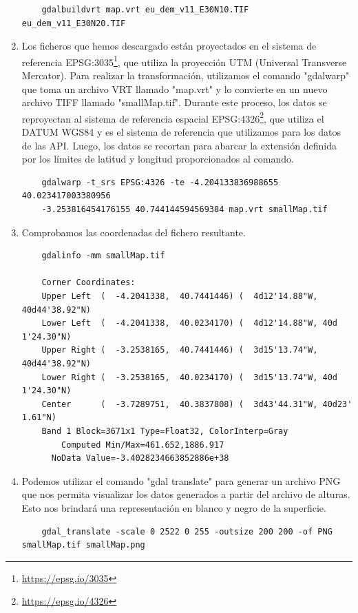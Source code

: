 \documentclass[a4paper, 11pt]{book}
\begin{document}
\begin{enumerate}
    {\scriptsize
    \begin{verbatim}
    gdalbuildvrt map.vrt eu_dem_v11_E30N10.TIF eu_dem_v11_E30N20.TIF
    \end{verbatim}
    }
    
    \item Los ficheros que hemos descargado están proyectados en el sistema de referencia EPSG:3035\footnote{\url{https://epsg.io/3035}}, que utiliza la proyección UTM (Universal Transverse Mercator). Para realizar la transformación, utilizamos el comando "gdalwarp" que toma un archivo VRT llamado "map.vrt" y lo convierte en un nuevo archivo TIFF llamado "smallMap.tif". Durante este proceso, los datos se reproyectan al sistema de referencia espacial EPSG:4326\footnote{\url{https://epsg.io/4326}}, que utiliza el DATUM WGS84 y es el sistema de referencia que utilizamos para los datos de las API. Luego, los datos se recortan para abarcar la extensión definida por los límites de latitud y longitud proporcionados al comando.

    {\scriptsize
    \begin{verbatim}
    gdalwarp -t_srs EPSG:4326 -te -4.204133836988655 40.023417003380956
    -3.253816454176155 40.744144594569384 map.vrt smallMap.tif
    \end{verbatim}
    }

    \item Comprobamos las coordenadas del fichero resultante.

    {\scriptsize
    \begin{verbatim}
    gdalinfo -mm smallMap.tif

    Corner Coordinates:
    Upper Left  (  -4.2041338,  40.7441446) (  4d12'14.88"W, 40d44'38.92"N)
    Lower Left  (  -4.2041338,  40.0234170) (  4d12'14.88"W, 40d 1'24.30"N)
    Upper Right (  -3.2538165,  40.7441446) (  3d15'13.74"W, 40d44'38.92"N)
    Lower Right (  -3.2538165,  40.0234170) (  3d15'13.74"W, 40d 1'24.30"N)
    Center      (  -3.7289751,  40.3837808) (  3d43'44.31"W, 40d23' 1.61"N)
    Band 1 Block=3671x1 Type=Float32, ColorInterp=Gray
        Computed Min/Max=461.652,1886.917
      NoData Value=-3.4028234663852886e+38
    \end{verbatim}
    }
    \item Podemos utilizar el comando "gdal translate" para generar un archivo PNG que nos permita visualizar los datos generados a partir del archivo de alturas. Esto nos brindará una representación en blanco y negro de la superficie.
    {\scriptsize
    \begin{verbatim}
    gdal_translate -scale 0 2522 0 255 -outsize 200 200 -of PNG smallMap.tif smallMap.png
    \end{verbatim}
    }
    

\end{enumerate}
\end{document}
